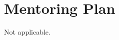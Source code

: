 \documentclass[fontsize=10pt,paper=letter,twoside=false,onecolumn]{scrartcl} %
\begin{document}
\section*{Mentoring Plan}
Not applicable.
\end{document}
